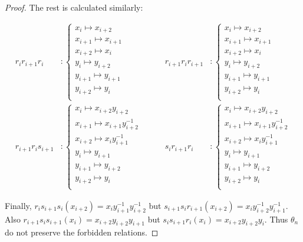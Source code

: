 \documentclass{article}
\begin{document}
\begin{proof}
The rest is calculated similarly:

\begin{align*}
r_ir_{i+1}r_i &:
\begin{cases}
x_i\mapsto x_{i+2}\\
x_{i+1}\mapsto x_{i+1}\\
x_{i+2}\mapsto x_i\\
y_{i} \mapsto y_{i+2}\\
y_{i+1} \mapsto y_{i+1}\\
y_{i+2} \mapsto y_{i}\\
\end{cases} &\qquad
r_{i+1}r_ir_{i+1} &:
\begin{cases}
x_i\mapsto x_{i+2}\\
x_{i+1}\mapsto x_{i+1}\\
x_{i+2}\mapsto x_i\\
y_{i} \mapsto y_{i+2}\\
y_{i+1} \mapsto y_{i+1}\\
y_{i+2} \mapsto y_{i}\\
\end{cases} \\ 
r_{i+1}r_is_{i+1} &:
\begin{cases}
x_i\mapsto x_{i+2}y_{i+2}\\
x_{i+1}\mapsto x_{i+1}y_{i+2}^{-1}\\
x_{i+2}\mapsto x_iy_{i+1}^{-1}\\
y_{i} \mapsto y_{i+1}\\
y_{i+1} \mapsto y_{i+2}\\
y_{i+2} \mapsto y_{i}\\
\end{cases} &\qquad
s_ir_{i+1}r_i &:
\begin{cases}
x_i\mapsto x_{i+2}y_{i+2}\\
x_{i+1}\mapsto x_{i+1}y_{i+2}^{-1}\\
x_{i+2}\mapsto x_iy_{i+1}^{-1}\\
y_{i}\mapsto y_{i+1}\\
y_{i+1}\mapsto y_{i+2}\\
y_{i+2}\mapsto y_{i}\\
\end{cases} 
\end{align*}

Finally, $r_is_{i+1}s_i(x_{i+2})=x_iy_{i+1}^{-1}y_{i+2}^{-1}$ but $s_{i+1}s_ir_{i+1}(x_{i+2})=x_iy_{i+2}^{-1}y_{i+1}^{-1}$. Also $r_{i+1}s_is_{i+1}(x_i)=x_{i+2}y_{i+2}y_{i+1}$ but $s_is_{i+1}r_i(x_i)=x_{i+2}y_{i+2}y_i$. Thus $\theta_n$ do not preserve the forbidden relations.    
\end{proof}
\end{document}
